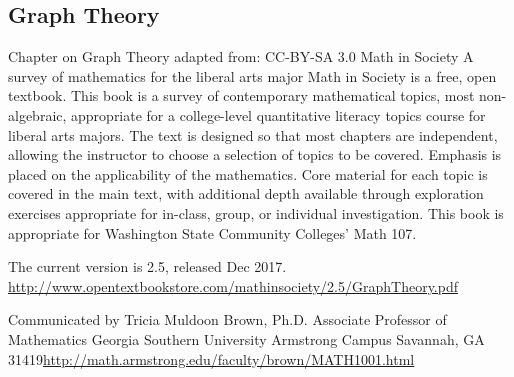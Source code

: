 \documentclass[letter,12pt]{book}
\renewcommand{\0}{\mathbf{0}}
\begin{document}
\subsection{Graph Theory}
Chapter on Graph Theory adapted from: 
CC-BY-SA 3.0
Math in Society
A survey of mathematics for the liberal arts major
Math in Society is a free, open textbook. This book is a survey of contemporary mathematical topics, most non-algebraic, appropriate for a college-level quantitative literacy topics course for liberal arts majors. The text is designed so that most chapters are independent, allowing the instructor to choose a selection of topics to be covered. Emphasis is placed on the applicability of the mathematics. Core material for each topic is covered in the main text, with additional depth available through exploration exercises appropriate for in-class, group, or individual investigation. This book is appropriate for Washington State Community Colleges' Math 107.

The current version is 2.5, released Dec 2017.
\url{http://www.opentextbookstore.com/mathinsociety/2.5/GraphTheory.pdf}

Communicated by 
Tricia Muldoon Brown, Ph.D.
Associate Professor of Mathematics
Georgia Southern University
Armstrong Campus
Savannah, GA 31419\url{http://math.armstrong.edu/faculty/brown/MATH1001.html}


%

	\cleardoublepage
	\printindex

%	
\end{document}
